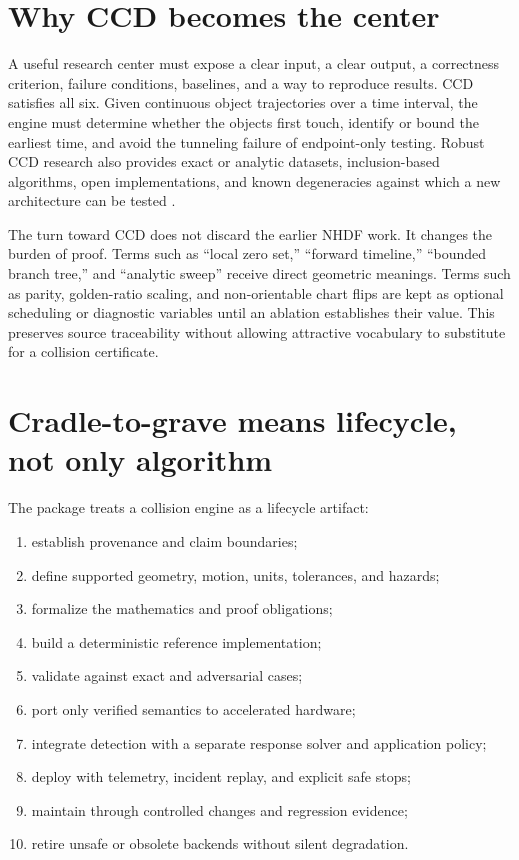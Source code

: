 \documentclass[11pt,a4paper,openany]{book}
\begin{document}
\section{Why CCD becomes the center}
A useful research center must expose a clear input, a clear output, a correctness criterion, failure conditions, baselines, and a way to reproduce results. CCD satisfies all six. Given continuous object trajectories over a time interval, the engine must determine whether the objects first touch, identify or bound the earliest time, and avoid the tunneling failure of endpoint-only testing. Robust CCD research also provides exact or analytic datasets, inclusion-based algorithms, open implementations, and known degeneracies against which a new architecture can be tested \citep{wang2021tight,belgrod2023toi}.

The turn toward CCD does not discard the earlier NHDF work. It changes the burden of proof. Terms such as ``local zero set,'' ``forward timeline,'' ``bounded branch tree,'' and ``analytic sweep'' receive direct geometric meanings. Terms such as parity, golden-ratio scaling, and non-orientable chart flips are kept as optional scheduling or diagnostic variables until an ablation establishes their value. This preserves source traceability without allowing attractive vocabulary to substitute for a collision certificate.

\section{Cradle-to-grave means lifecycle, not only algorithm}
The package treats a collision engine as a lifecycle artifact:
\begin{enumerate}
  \item establish provenance and claim boundaries;
  \item define supported geometry, motion, units, tolerances, and hazards;
  \item formalize the mathematics and proof obligations;
  \item build a deterministic reference implementation;
  \item validate against exact and adversarial cases;
  \item port only verified semantics to accelerated hardware;
  \item integrate detection with a separate response solver and application policy;
  \item deploy with telemetry, incident replay, and explicit safe stops;
  \item maintain through controlled changes and regression evidence;
  \item retire unsafe or obsolete backends without silent degradation.
\end{enumerate}
\end{document}
